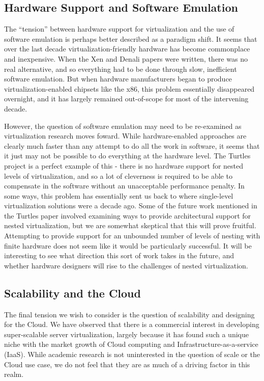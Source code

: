 \documentclass[letterpaper, twocolumn]{article}
\begin{document}
\subsection{Hardware Support and Software Emulation}
\label{sec:relns/hard-emul}

The ``tension'' between hardware support for virtualization and the use of software
emulation is perhaps better described as a paradigm shift.  It seems
that over the last decade virtualization-friendly hardware has become commonplace
and inexpensive.  When the Xen and Denali papers were written, there was no real
alternative, and so everything had to be done through slow, inefficient software emulation.
But when hardware manufacturers began to produce virtualization-enabled chipsets
like the x86, this problem essentially disappeared overnight, and it has largely
remained out-of-scope for most of the intervening decade.

However, the question of software emulation may need to be re-examined as virtualization
research moves foward.  While hardware-enabled approaches are clearly much faster
than any attempt to do all the work in software, it seems that it just may not be possible to do
everything at the hardware level.  The Turtles project is a perfect example of this - there
is no hardware support for nested levels of virtualization, and so a lot of cleverness
is required to be able to compensate in the software without an unacceptable performance
penalty.  In some ways, this problem has essentially sent us back to where single-level virtualization
solutions were a decade ago.  Some of the future work mentioned in the Turtles paper involved
examining ways to provide architectural support for nested virtualization, but
we are somewhat skeptical that this will prove fruitful.  Attempting to provide
support for an unbounded number of levels of nesting with finite hardware does
not seem like it would be particularly successful.  It will be interesting to
see what direction this sort of work takes in the future, and whether hardware
designers will rise to the challenges of nested virtualization.

\subsection{Scalability and the Cloud}
\label{sec:relns/scale}

The final tension we wish to consider is the question of scalability and designing
for the Cloud.  We have observed
that there is a commercial interest in developing super-scalable server virtualization,
largely because it has found such a unique niche with the market growth of Cloud computing
and Infrastructure-as-a-service (IaaS).  While academic research is not uninterested in the question
of scale or the Cloud use case, we do not feel that they are as much of a driving factor in this realm.
\end{document}
